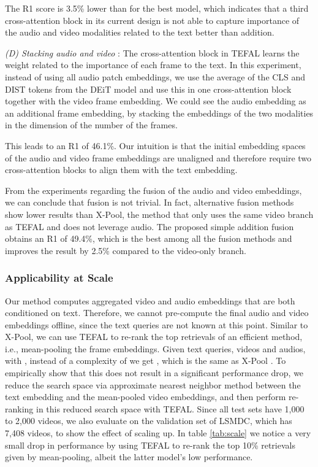 \documentclass[10pt,twocolumn,letterpaper]{article}
\begin{document}
    
    The R1 score is 3.5\% lower than for the best model, which indicates that a third cross-attention block in its current design is not able to capture importance of the audio and video modalities related to the text better than addition.
    
    \noindent \textit{(D) Stacking audio and video} : The cross-attention block in TEFAL learns the weight related to the importance of each frame to the text. In this experiment, instead of using all audio patch embeddings, we use the average of the CLS and DIST tokens from the DEiT model and use this in one cross-attention block together with the video frame embedding. We could see the audio embedding as an additional frame embedding, by stacking the embeddings of the two modalities in the dimension of the number of the frames. 
    

This leads to an R1 of 46.1\%. Our intuition is that the initial embedding spaces of the audio and video frame embeddings are unaligned and therefore require two cross-attention blocks to align them with the text embedding.

From the experiments regarding the fusion of the audio and video embeddings, we can conclude that fusion is not trivial. In fact, alternative fusion methods show lower results than X-Pool, the method that only uses the same video branch as TEFAL and does not leverage audio. The proposed simple addition fusion obtains an R1 of 49.4\%, which is the best among all the fusion methods and improves the result by 2.5\% compared to the video-only branch.

\subsubsection{Applicability at Scale} 
Our method computes aggregated video and audio embeddings that are both conditioned on text. Therefore, we cannot pre-compute the final audio and video embeddings offline, since the text queries are not known at this point. Similar to X-Pool, we can use TEFAL to re-rank the top  retrievals of an efficient method, i.e., mean-pooling the frame embeddings. Given  text queries,  videos and  audios, with , instead of a complexity of  we get , which is the same as X-Pool \cite{gorti2022xpool}. To empirically show that this does not result in a significant performance drop, we reduce the search space via approximate nearest neighbor method between the text embedding and the mean-pooled video embeddings, and then perform re-ranking in this reduced search space with TEFAL. Since all test sets have 1,000 to 2,000 videos, we also evaluate on the validation set of LSMDC, which has 7,408 videos, to show the effect of scaling up. In table \ref{tab:scale} we notice a very small drop in performance by using TEFAL to re-rank the top 10\% retrievals given by mean-pooling, albeit the latter model's low performance. 
\end{document}
